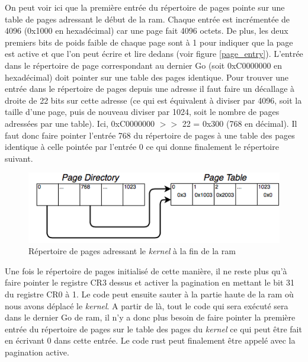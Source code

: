 On peut voir ici que la première entrée du répertoire de pages pointe sur une
table de pages adressant le début de la \acrshort{ram}. Chaque entrée est incrémentée
de 4096 (0x1000 en hexadécimal) car une page fait 4096 octets. De plus, les deux
premiers bits de poids faible de chaque page sont à 1 pour indiquer que la page est
active et que l'on peut écrire et lire dedans (voir figure \ref{page_entry}). L'entrée
dans le répertoire de page correspondant au dernier Go (soit 0xC0000000 en hexadécimal)
doit pointer sur une table des pages identique. Pour trouver une entrée dans le
répertoire de pages depuis une adresse il faut faire un décallage à droite de 22
bits sur cette adresse (ce qui est équivalent à diviser par 4096, soit la taille
d'une page, puis de nouveau diviser par 1024, soit le nombre de pages adressées par
une table). Ici, 0xC0000000 $>>$ 22 = 0x300 (768 en décimal). Il faut donc faire
pointer l'entrée 768 du répertoire de pages à une table des pages identique à
celle pointée par l'entrée 0 ce qui donne finalement le répertoire suivant.

\begin{figure}[!h]
  \centering
  \includegraphics[scale=0.65]{images/high_kern_pd.png}
  \caption{Répertoire de pages adressant le \textit{kernel} à la fin de la \acrshort{ram}}
  \label{high_kern_pd}
\end{figure}

Une fois le répertoire de pages initialisé de cette manière, il ne reste plus
qu'à faire pointer le registre CR3 dessus et activer la pagination en mettant
le bit 31 du registre CR0 à 1. Le code peut ensuite sauter à la partie haute de
la \acrshort{ram} où nous avons déplacé le \textit{kernel}. A partir de là,
tout le code qui sera exécuté sera dans le dernier Go de \acrshort{ram}, il n'y
a donc plus besoin de faire pointer la première entrée du répertoire de pages
sur le table des pages du \textit{kernel} ce qui peut être fait en écrivant 0
dans cette entrée. Le code rust peut finalement être appelé avec la pagination
active.


